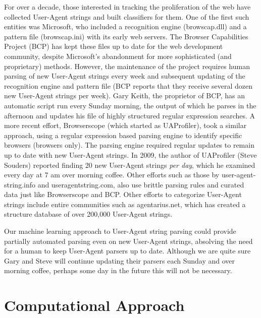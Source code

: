 \documentclass[10pt]{article}
\begin{document}
\begin{multicols}{2}
For over a decade, those interested in tracking the proliferation of the web have collected User-Agent strings and built classifiers for them.  One of the first such entities was Microsoft, who included a recognition engine (browscap.dll) and a pattern file (browscap.ini) with its early web servers.\cite{bcp}  The Browser Capabilities Project (BCP) has kept these files up to date for the web development community, despite Microsoft's abandonment for more sophisticated (and proprietary) methods.\cite{bcp}  However, the maintenance of the project requires human parsing of new User-Agent strings every week and subsequent updating of the recognition engine and pattern file (BCP reports that they receive several dozen new User-Agent strings per week).  Gary Keith, the proprietor of BCP, has an automatic script run every Sunday morning, the output of which he parses in the afternoon and updates his file of highly structured regular expression searches.  A more recent effort, Browserscope (which started as UAProfiler), took a similar approach, using a regular expression based parsing engine to identify specific browsers (browsers only). \cite{souders}  The parsing engine required regular updates to remain up to date with new User-Agent strings.  In 2009, the author of UAProfiler (Steve Souders) reported finding 20 new User-Agent strings {\it per day}, which he examined every day at 7 am over morning coffee. \cite{souders2}  Other efforts such as those by user-agent-string.info and useragentstring.com, also use brittle parsing rules and curated data just like Browserscope and BCP.  \cite{uas.info,uas.com}  Other efforts to categorize User-Agent strings include entire communities such as agentarius.net, which has created a structure database of over 200,000 User-Agent strings.   

Our machine learning approach to User-Agent string parsing could provide partially automated parsing even on new User-Agent strings, absolving the need for a human to keep User-Agent parsers up to date.  Although we are quite sure Gary and Steve will continue updating their parsers each Sunday and over morning coffee, perhaps some day in the future this will not be necessary.

\section{Computational Approach}

\end{multicols}
\end{document}
